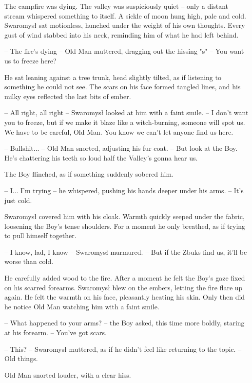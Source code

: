 \sloppy 
\indent The campfire was dying. The valley was suspiciously quiet -- only a distant stream whispered something to itself. A sickle of moon hung high, pale and cold. Swaromysł sat motionless, hunched under the weight of his own thoughts. Every gust of wind stabbed into his neck, reminding him of what he had left behind. 
\par\noindent-- The fire's dying -- Old Man muttered, dragging out the hissing "s" -- You want us to freeze here? 
\par\indent He sat leaning against a tree trunk, head slightly tilted, as if listening to something he could not see. The scars on his face formed tangled lines, and his milky eyes reflected the last bits of ember. 
\par\noindent-- All right, all right -- Swaromysł looked at him with a faint smile. -- I don't want you to freeze, but if we make it blaze like a witch-burning, someone will spot us. We have to be careful, Old Man. You know we can't let anyone find us here. 
\par\noindent -- Bullshit... -- Old Man snorted, adjusting his fur coat. -- But look at the Boy. He's chattering his teeth so loud half the Valley's gonna hear us. 
\par\indent The Boy flinched, as if something suddenly sobered him. 
\par\noindent-- I... I'm trying -- he whispered, pushing his hands deeper under his arms. -- It's just cold. 
\par\indent Swaromysł covered him with his cloak. Warmth quickly seeped under the fabric, loosening the Boy's tense shoulders. For a moment he only breathed, as if trying to pull himself together. 
\par\noindent-- I know, lad, I know -- Swaromysł murmured. -- But if the Zbuks find us, it'll be worse than cold. 
\par\indent He carefully added wood to the fire. After a moment he felt the Boy's gaze fixed on his scarred forearms. Swaromysł blew on the embers, letting the fire flare up again. He felt the warmth on his face, pleasantly heating his skin. Only then did he notice Old Man watching him with a faint smile. 
\par\noindent-- What happened to your arms? -- the Boy asked, this time more boldly, staring at his forearm. -- You've got scars. 
\par\noindent-- This? -- Swaromysł muttered, as if he didn't feel like returning to the topic. -- Old things. 
\par\indent Old Man snorted louder, with a clear hiss. 

